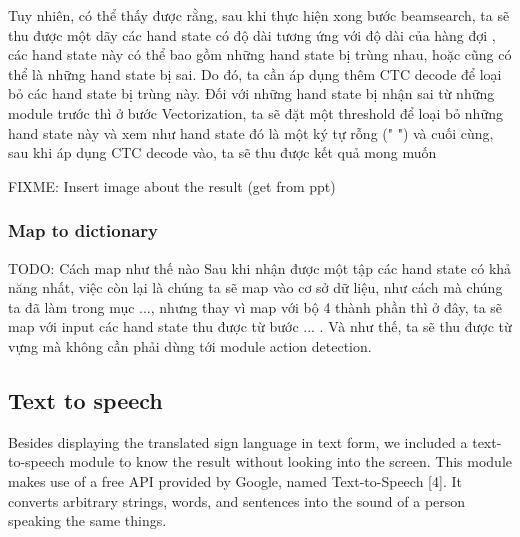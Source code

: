       Tuy nhiên, có thể thấy được rằng, sau khi thực hiện xong bước beamsearch,
      ta sẽ thu được một dãy các hand state có độ dài tương ứng với độ dài của hàng đợi
      , các hand state này có thể bao gồm những hand state bị trùng nhau, hoặc cũng có thể
      là những hand state bị sai. Do đó, ta cần áp dụng thêm CTC decode để loại bỏ các hand state
      bị trùng này. Đối với những hand state bị nhận sai từ những module trước thì ở bước Vectorization,
      ta sẽ đặt một threshold để loại bỏ những hand state này và xem như hand state đó là một ký tự rỗng (" ")
      và cuối cùng, sau khi áp dụng CTC decode vào, ta sẽ thu được kết quả mong muốn

      FIXME: Insert image about the result (get from ppt)

      
      
    \subsubsection{ Map to dictionary }
      TODO: Cách map như thế nào
      Sau khi nhận được một tập các hand state có khả năng nhất, việc còn lại là
      chúng ta sẽ map vào cơ sở dữ liệu, như cách mà chúng ta đã làm trong mục ..., 
      nhưng thay vì map với bộ 4 thành phần thì ở đây, ta sẽ map với input các hand state thu được
      từ bước ... .
      Và như thế, ta sẽ thu được từ vựng mà không cần phải dùng tới module action detection.

\subsection{Text to speech}

Besides displaying the translated sign language in text form, we included a text-to-speech module to know the result without looking into the screen. This module makes use of a free API provided by Google, named Text-to-Speech [4]. It converts arbitrary strings, words, and sentences into the sound of a person speaking the same things.
